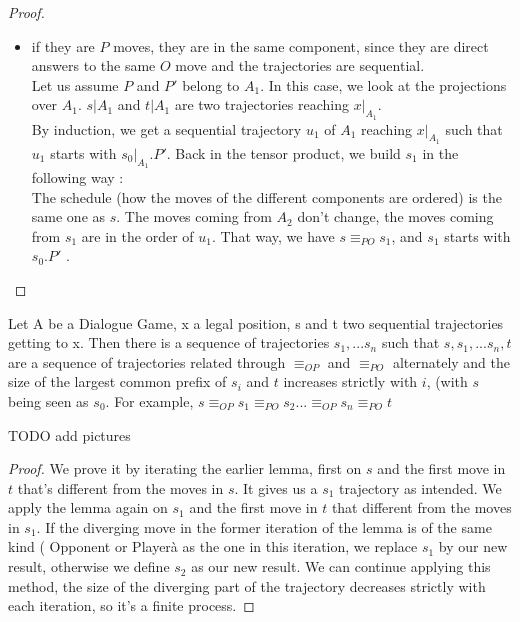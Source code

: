 \documentclass[a4paper,UKenglish]{lipics}
\begin{document}
\begin{proof}
\begin{itemize}
\begin{itemize}
\end{itemize}
\item if they are $P$ moves,  they are in the same component, since they are direct answers to the same $O$ move and the trajectories are sequential.\\ Let us assume $P$ and $P'$ belong to $A_1$. In this case, we look at the projections over $A_1$. $s|A_1$ and $t|A_1$ are two trajectories reaching $x|_{A_1}$.\\
 By induction, we get a sequential trajectory $u_1$ of $A_1$ reaching $x|_{A_1}$ such that $u_1$ starts with $s_0|_{A_1}.P'$. Back in the tensor product, we build $s_1$ in the following way :\\
 The schedule (how the moves of the different components are ordered) is the same one as $s$. The moves coming from $A_2$ don't change, the moves coming from $s_1$ are in the order of $u_1$. That way, we have $s \equiv_{PO} s_1$, and $s_1$ starts with $s_0.P'$ . \\


\end{itemize}
\end{proof}



\begin{lemma}
Let A be a Dialogue Game, x a legal position, s and t two sequential trajectories getting to x. Then there is a sequence of trajectories $s_1,...s_n$ such that $s,s_1,... s_n,t$ are a sequence of trajectories related through $\equiv_{OP}$ and $\equiv_{PO}$ alternately and the size of the largest common prefix of $s_i$ and $t$ increases strictly with $i$, (with $s$ being seen as $s_0$. For example,  $s \equiv_{OP} s_1\equiv_{PO} s_2 ... \equiv_{OP} s_n \equiv_{PO} t$
\end{lemma} 
TODO add pictures
\begin{proof}
We prove it by iterating the earlier lemma, first on $s$ and the first move in $t$ that's different from the moves in $s$. It gives us a $s_1$ trajectory as intended. We apply the lemma again on $s_1$ and the first move in $t$ that different from the moves in $s_1$. If the diverging move in the former iteration of the lemma is of the same kind ( Opponent or Playerà as the one in this iteration, we replace $s_1$ by our new result, otherwise we define $s_2$ as our new result. We can continue applying this method, the size of the diverging part of the trajectory decreases strictly with each iteration, so it's a finite process.
\end{proof}
\end{document}
